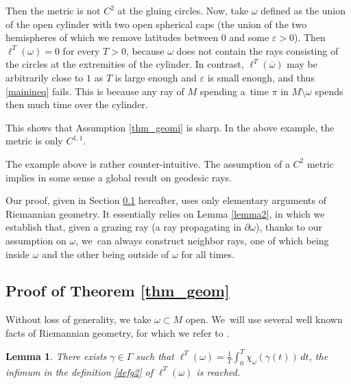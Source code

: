 \documentclass[10pt]{amsart}
\newtheorem{lemma}{Lemma}
\theoremstyle{definition}
\begin{document}
\begin{itemize}
Then the metric is not $C^2$ at the gluing circles. Now, take $\omega$ defined as the union of the open cylinder with two open spherical caps (\ie the union of the two hemispheres of which we remove latitudes between $0$ and some $\varepsilon>0$). Then $\ell^T(\omega)=0$ for every $T>0$, because $\omega$ does not contain the rays consisting of the circles at the extremities of the cylinder. In contrast, $\ell^T(\overline\omega)$ may be arbitrarily close to $1$ as $T$ is large enough and $\varepsilon$ is small enough, and thus \eqref{mainineq} fails. This is because any ray of $M$ spending a~time $\pi$ in $M\setminus\omega$ spends then much time over the cylinder.

This shows that Assumption \eqref{thm_geomi} is sharp. In the above example, the metric is only $C^{1,1}$.

The example above is rather counter-intuitive. The assumption of a $C^2$ metric implies in some sense a global result on geodesic rays.
\end{itemize}

Our proof, given in Section \ref{sec_proof_thm_geom} hereafter, uses only elementary arguments of Riemannian geometry. It essentially relies on Lemma \ref{lemma2}, in which we establish that, given a grazing ray (\ie a ray propagating in $\partial\omega$), thanks to our assumption on $\omega$, we~can always construct neighbor rays, one of which being inside $\omega$ and the other being outside of $\omega$ for all times.

\subsection{Proof of Theorem \ref{thm_geom}}\label{sec_proof_thm_geom}
Without loss of generality, we take $\omega\subset M$ open.
We~will use several well known facts of Riemannian geometry, for which we refer to \cite{Berger}.

\begin{lemma}\label{lemma1}
There exists $\gamma\in\Gamma$ such that $\ell^T(\omega) = \frac{1}{T}\int_0^T\chi_\omega(\gamma(t))\, dt$, \ie the infimum in the definition \eqref{defg2} of $\ell^T(\omega)$ is reached.
\end{lemma}
\end{document}
